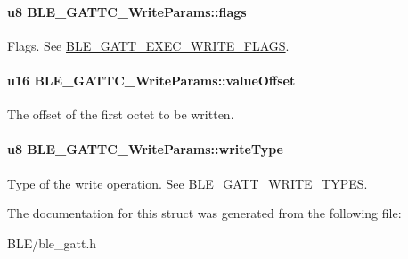 \paragraph[{\texorpdfstring{flags}{flags}}]{\setlength{\rightskip}{0pt plus 5cm}u8 B\+L\+E\+\_\+\+G\+A\+T\+T\+C\+\_\+\+Write\+Params\+::flags}\hypertarget{struct_b_l_e___g_a_t_t_c___write_params_a31c45974bba26b865efd808329baf848}{}\label{struct_b_l_e___g_a_t_t_c___write_params_a31c45974bba26b865efd808329baf848}
Flags. See \hyperlink{group___b_l_e___g_a_t_t___e_x_e_c___w_r_i_t_e___f_l_a_g_s}{B\+L\+E\+\_\+\+G\+A\+T\+T\+\_\+\+E\+X\+E\+C\+\_\+\+W\+R\+I\+T\+E\+\_\+\+F\+L\+A\+GS}. 
\paragraph[{\texorpdfstring{value\+Offset}{valueOffset}}]{\setlength{\rightskip}{0pt plus 5cm}u16 B\+L\+E\+\_\+\+G\+A\+T\+T\+C\+\_\+\+Write\+Params\+::value\+Offset}\hypertarget{struct_b_l_e___g_a_t_t_c___write_params_a70cea5a1c48f5bb99750fa8a4ce9e539}{}\label{struct_b_l_e___g_a_t_t_c___write_params_a70cea5a1c48f5bb99750fa8a4ce9e539}
The offset of the first octet to be written. 
\paragraph[{\texorpdfstring{write\+Type}{writeType}}]{\setlength{\rightskip}{0pt plus 5cm}u8 B\+L\+E\+\_\+\+G\+A\+T\+T\+C\+\_\+\+Write\+Params\+::write\+Type}\hypertarget{struct_b_l_e___g_a_t_t_c___write_params_a449609583fc6fcbc7c2015e8a0504a95}{}\label{struct_b_l_e___g_a_t_t_c___write_params_a449609583fc6fcbc7c2015e8a0504a95}
Type of the write operation. See \hyperlink{group___b_l_e___g_a_t_t___w_r_i_t_e___t_y_p_e_s}{B\+L\+E\+\_\+\+G\+A\+T\+T\+\_\+\+W\+R\+I\+T\+E\+\_\+\+T\+Y\+P\+ES}. 

The documentation for this struct was generated from the following file\+:\begin{DoxyCompactItemize}
\item 
B\+L\+E/ble\+\_\+gatt.\+h\end{DoxyCompactItemize}
